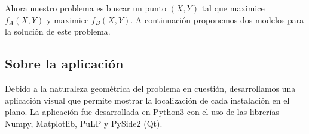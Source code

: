 Ahora nuestro problema es buscar un punto $(X, Y)$ tal que maximice $f_A(X, Y)$ y maximice $f_B(X, Y)$. A continuación proponemos dos modelos para la solución de este problema.

\subsection{Sobre la aplicación}

Debido a la naturaleza geométrica del problema en cuestión, desarrollamos una aplicación visual que permite mostrar la localización de cada instalación en el plano. La aplicación fue desarrollada en Python3 con el uso de las librerías Numpy, Matplotlib, PuLP y PySide2 (Qt).